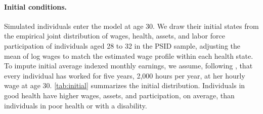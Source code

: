 \paragraph{Initial conditions.} Simulated individuals enter the model at age 30. We draw their initial states from the empirical joint distribution of wages, health, assets, and labor force participation of individuals aged 28 to 32 in the PSID sample, %
adjusting the mean of log wages to match the estimated wage profile within each health state. To impute initial average indexed monthly earnings, we assume, following \citet{french2005effects}, that every individual has worked for five years, 2,000 hours per year, at her hourly wage at age 30. %
\autoref{tab:initial} summarizes the initial distribution. Individuals in good health have higher wages, assets, and participation, on average, than individuals in poor health or with a disability.

\begin{table}[!htbp]
\centering
\caption{Initial Conditions}\label{tab:initial}
\small

\end{table}
